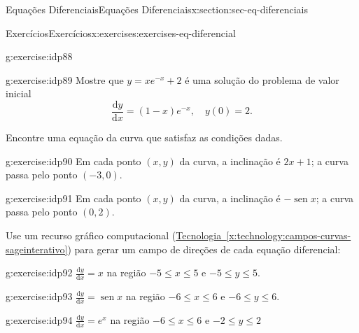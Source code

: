\documentclass[oneside,10pt,]{article}
\newcommand{\xreffont}{\relax}
\numberwithin{equation}{section}
\newcommand{\dd}{\mathrm{d}}
\DeclareMathOperator{\sin}{sen}
\begin{document}
\begin{sectionptx}{Equações Diferenciais}{}{Equações Diferenciais}{}{}{x:section:sec-eq-diferenciais}
\begin{exercises-subsection}{Exercícios}{}{Exercícios}{}{}{x:exercises:exercises-eq-diferencial}
\begin{divisionexercise}{7}{}{}{g:exercise:idp88}
\end{divisionexercise}%
\begin{divisionexercise}{8}{}{}{g:exercise:idp89}%
Mostre que \(y=xe^{-x} + 2\) é uma solução do problema de valor inicial%
%
\begin{equation*}
\frac{\dd y}{\dd x} = (1-x)e^{-x}, \quad y(0)=2.
\end{equation*}
\end{divisionexercise}%
\par\medskip\noindent%
%
Encontre uma equação da curva que satisfaz as condições dadas.%
\begin{exercisegroup}
\begin{divisionexerciseeg}{9}{}{}{g:exercise:idp90}%
Em cada ponto \((x, y)\) da curva, a inclinação é \(2x + 1\); a curva passa pelo ponto \((−3, 0)\).%
\end{divisionexerciseeg}%
\begin{divisionexerciseeg}{10}{}{}{g:exercise:idp91}%
Em cada ponto \((x, y)\) da curva, a inclinação é \(−\sin{x} \); a curva passa pelo ponto \((0, 2)\).%
\end{divisionexerciseeg}%
\end{exercisegroup}
\par\medskip\noindent
\par\medskip\noindent%
%
Use um recurso gráfico computacional (\hyperref[x:technology:campos-curvas-sageinterativo]{Tecnologia~{\xreffont\ref{x:technology:campos-curvas-sageinterativo}}}) para gerar um campo de direções de cada equação diferencial:%
\begin{exercisegroup}
\begin{divisionexerciseeg}{11}{}{}{g:exercise:idp92}%
\(\frac{\dd y}{\dd x} = x\) na região \(−5 \leq x \leq 5\) e \(−5 \leq y \leq 5.\)%
\end{divisionexerciseeg}%
\begin{divisionexerciseeg}{12}{}{}{g:exercise:idp93}%
\(\frac{\dd y}{\dd x} = \sin{x}\) na região \(−6 \leq x \leq 6\) e \(−6 \leq y \leq 6.\)%
\end{divisionexerciseeg}%
\begin{divisionexerciseeg}{13}{}{}{g:exercise:idp94}%
\(\frac{\dd y}{\dd x} = e^x\) na região \(−6 \leq x \leq 6\) e \(−2 \leq y \leq 2\)%
\end{divisionexerciseeg}%
\end{exercisegroup}
\par\medskip\noindent
\end{exercises-subsection}
\end{sectionptx}
\end{document}
